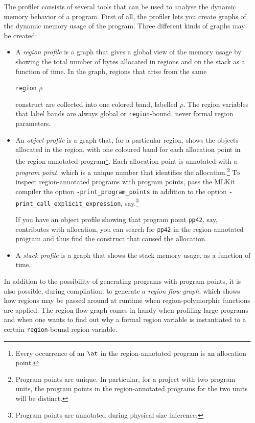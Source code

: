 \documentclass[12pt]{book}
\begin{document}
The profiler consists of several tools that can be used to analyse the
dynamic memory behavior of a program. First of all, the profiler lets
you create graphs of the dynamic memory usage of the program. Three
different kinds of graphs may be created:
\begin{itemize}
\item A
  {\em region profile\/} is a graph that gives a global view of the
  memory usage by showing the total number of bytes allocated in
  regions and on the stack as a function of time. In the graph,
  regions that arise from the same
  \begin{center}
    \texttt{region} $\rho$
  \end{center}
  construct are collected into one colored band, labelled $\rho$. The
  region variables that label bands are always global or {\tt region}-bound,
  never formal region parameters.
\item An
  {\em object profile\/} is a graph that, for a particular region,
  shows the objects allocated in the region, with one coloured band
  for each allocation point in the region-annotated
  program\footnote{Every occurrence of an $\at$ in the
    region-annotated program is an allocation point.}. Each allocation
  point is annotated with a
  {\em program point}, which is a unique number that identifies the
  allocation.\footnote{Program points are unique. In particular, for a
    project with two program units, the program points in the
    region-annotated programs for the two units will be distinct.}  To
  inspect region-annotated programs with program points, pass the
  MLKit compiler the option \texttt{-print\_program\_points} in
  addition to the option \texttt{-print\_call\_explicit\_expression},
  say.\footnote{Program points are annotated during physical size
    inference.}

  If you have an object profile showing that program point
  \texttt{pp42}, say, contributes with allocation, you can search for
  \texttt{pp42} in the region-annotated program and thus find the
  construct that caused the allocation.
\item A
  {\em stack profile\/} is a graph that shows the stack memory usage,
  as a function of time.
\end{itemize}

In addition to the possibility of generating programs with program
points, it is also possible, during compilation, to generate a
%
{\em region flow graph}, which shows how regions may be passed around
at runtime when region-polymorphic functions are applied. The region
flow graph comes in handy when profiling large programs and when one wants
to find out why a formal region variable is instantiated to a
certain {\tt region}-bound region variable.
\end{document}
